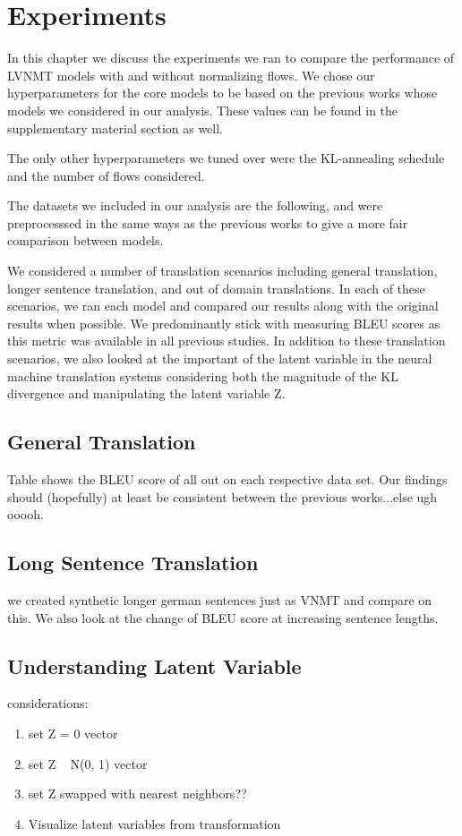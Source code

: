 \chapter{Experiments}

In this chapter we discuss the experiments we ran to compare the performance of \ac{LVNMT} models with and without normalizing flows. We chose our hyperparameters for the core models to be based on the previous works whose models we considered in our analysis. These values can be found in the supplementary material section as well. 

The only other hyperparameters we tuned over were the KL-annealing schedule and the number of flows considered. 

The datasets we included in our analysis are the following, and were preprocesssed in the same ways as the previous works to give a more fair comparison between models. 


We considered a number of translation scenarios including general translation, longer sentence translation, and out of domain translations. In each of these scenarios, we ran each model and compared our results along with the original results when possible. We predominantly stick with measuring BLEU scores as this metric was available in all previous studies. In addition to these translation scenarios, we also looked at the important of the latent variable in the neural machine translation systems considering both the magnitude of the KL divergence and manipulating the latent variable Z. 

\section{General Translation}

Table \reminder{\#} shows the BLEU score of all out on each respective data set. Our findings should (hopefully) at least be consistent between the previous works...else ugh ooooh.

\section{Long Sentence Translation}

we created synthetic longer german sentences just as VNMT and compare on this. We also look at the change of BLEU score at increasing sentence lengths.



\section{Understanding Latent Variable}

considerations:
\begin{enumerate}
	\item set Z = 0 vector
	\item set Z ~ N(0, 1) vector
	\item set Z swapped with nearest neighbors??
	\item Visualize latent variables from transformation
\end{enumerate}
